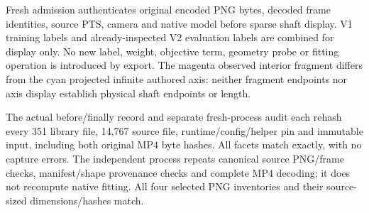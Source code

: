 \documentclass[11pt,letterpaper]{article}
\begin{document}
Fresh admission authenticates original encoded PNG bytes, decoded frame identities,
source PTS, camera and native model before sparse shaft display. V1 training labels and
already-inspected V2 evaluation labels are combined for display only. No new label,
weight, objective term, geometry probe or fitting operation is introduced by export.
The magenta observed interior fragment differs from the cyan projected infinite authored
axis: neither fragment endpoints nor axis display establish physical shaft endpoints or length.

The actual before/finally record and separate fresh-process audit each rehash every
351 library file, 14,767 source file, runtime/config/helper pin and immutable input,
including both original MP4 byte hashes. All facets match exactly, with no capture errors.
The independent process repeats canonical source PNG/frame checks, manifest/shape
provenance checks and complete MP4 decoding; it does not recompute native fitting.
All four selected PNG inventories and their source-sized dimensions/hashes match.
\end{document}
